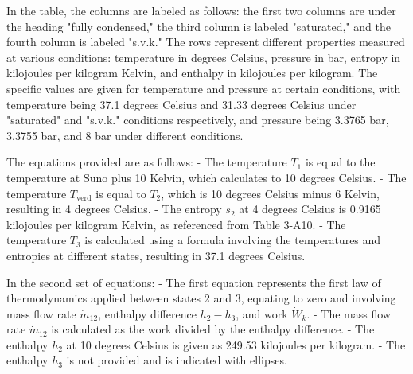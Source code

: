In the table, the columns are labeled as follows: the first two columns are under the heading "fully condensed," the third column is labeled "saturated," and the fourth column is labeled "s.v.k." The rows represent different properties measured at various conditions: temperature in degrees Celsius, pressure in bar, entropy in kilojoules per kilogram Kelvin, and enthalpy in kilojoules per kilogram. The specific values are given for temperature and pressure at certain conditions, with temperature being 37.1 degrees Celsius and 31.33 degrees Celsius under "saturated" and "s.v.k." conditions respectively, and pressure being 3.3765 bar, 3.3755 bar, and 8 bar under different conditions.

The equations provided are as follows:
- The temperature \( T_1 \) is equal to the temperature at Suno plus 10 Kelvin, which calculates to 10 degrees Celsius.
- The temperature \( T_{\text{verd}} \) is equal to \( T_2 \), which is 10 degrees Celsius minus 6 Kelvin, resulting in 4 degrees Celsius.
- The entropy \( s_2 \) at 4 degrees Celsius is 0.9165 kilojoules per kilogram Kelvin, as referenced from Table 3-A10.
- The temperature \( T_3 \) is calculated using a formula involving the temperatures and entropies at different states, resulting in 37.1 degrees Celsius.

In the second set of equations:
- The first equation represents the first law of thermodynamics applied between states 2 and 3, equating to zero and involving mass flow rate \( \dot{m}_{12} \), enthalpy difference \( h_2 - h_3 \), and work \( \dot{W}_k \).
- The mass flow rate \( \dot{m}_{12} \) is calculated as the work divided by the enthalpy difference.
- The enthalpy \( h_2 \) at 10 degrees Celsius is given as 249.53 kilojoules per kilogram.
- The enthalpy \( h_3 \) is not provided and is indicated with ellipses.
